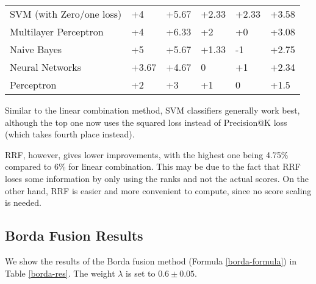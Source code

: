 \begin{table}[h!]
{\begin{tabular}{@{}llllll@{}}
SVM (with Zero/one loss)                       	& +4                       & +5.67                       & +2.33                    & +2.33                       & +3.58             \\
Multilayer Perceptron				& +4 			   & +6.33 			 & +2 			    & +0 			  & +3.08 \\
Naive Bayes                                    	& +5                       & +5.67                       & +1.33                    & -1                          & +2.75             \\
Neural Networks                              	& +3.67                    & +4.67                       & 0                        & +1                          & +2.34             \\
Perceptron                                     	& +2                       & +3                          & +1                       & 0                           & +1.5              \\ \bottomrule
\end{tabular}%
}
\end{table}

Similar to the linear combination method, SVM classifiers generally work best,
although the top one now uses the squared loss instead of Precision@K loss (which takes fourth place instead).

RRF, however, gives lower improvements, with the highest one being 4.75\%
compared to 6\% for linear combination.
This may be due to the fact that RRF loses some information by only using the ranks and not the actual scores. On the other hand, RRF
is easier and more convenient to compute, since no score scaling is needed.


\subsection{Borda Fusion Results}
We show the results of the Borda fusion method (Formula \ref{borda-formula}) in Table \ref{borda-res}.
The weight $\lambda$ is set to $0.6\pm 0.05$.

